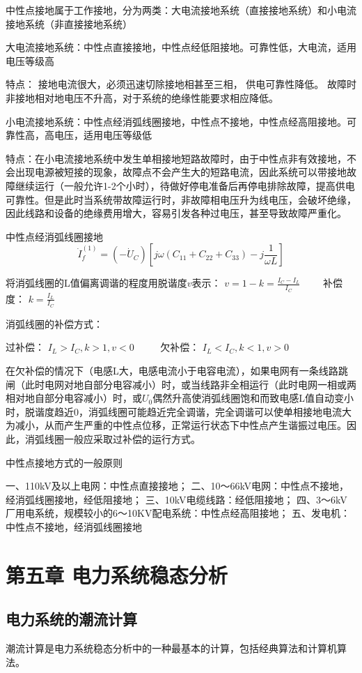 \documentclass[UTF8, 12pt, a4paper]{ctexart}
\begin{document}
中性点接地属于工作接地，分为两类：大电流接地系统（直接接地系统）和小电流接地系统（非直接接地系统）

大电流接地系统：中性点直接接地，中性点经低阻接地。可靠性低，大电流，适用电压等级高

特点： 接地电流很大，必须迅速切除接地相甚至三相， 供电可靠性降低。
故障时非接地相对地电压不升高，对于系统的绝缘性能要求相应降低。

小电流接地系统：中性点经消弧线圈接地，中性点不接地，中性点经高阻接地。可靠性高，高电压，适用电压等级低

特点：在小电流接地系统中发生单相接地短路故障时，由于中性点非有效接地，不会出现电源被短接的现象，故障点不会产生大的短路电流，因此系统可以带接地故障继续运行（一般允许1-2个小时），待做好停电准备后再停电排除故障，提高供电可靠性。但是此时当系统带故障运行时，非故障相电压升为线电压，会破坏绝缘，因此线路和设备的绝缘费用增大，容易引发各种过电压，甚至导致故障严重化。

中性点经消弧线圈接地
\[\dot { I } _ { f } ^ { ( 1 ) } = ( - \dot { U } _ { C } ) [ j \omega ( C _ { 11 } + C _ { 22 } + C _ { 33 } ) -j \frac { 1 } { \omega L }]\]

将消弧线圈的L值偏离调谐的程度用脱谐度$v$表示：
$v = 1 - k= \frac { I _ { C } - I _ { L } } { I _ { C } }$$\qquad$
补偿度：
$k = \frac { I _ { L } } { I _ { C } }$

消弧线圈的补偿方式：

过补偿：
$I _ { L } > I _ { C } , k > 1,v < 0 $
$\qquad$
欠补偿：
$I _ { L } < I _ { C } , k < 1,v > 0 $

在欠补偿的情况下（电感L大，电感电流小于电容电流），如果电网有一条线路跳闸（此时电网对地自部分电容减小）时，或当线路非全相运行（此时电网一相或两相对地自部分电容减小）时，或$U_0$偶然升高使消弧线圈饱和而致电感L值自动变小时，脱谐度趋近0，消弧线圈可能趋近完全调谐，完全调谐可以使单相接地电流大为减小，从而产生严重的中性点位移，正常运行状态下中性点产生谐振过电压。因此，消弧线圈一般应采取过补偿的运行方式。

中性点接地方式的一般原则

一、110kV及以上电网：中性点直接接地；
二、10～66kV电网：中性点不接地，经消弧线圈接地，经低阻接地；
三、10kV电缆线路：经低阻接地；
四、3～6kV厂用电系统，规模较小的6～10KV配电系统：中性点经高阻接地；
五、发电机：中性点不接地，经消弧线圈接地
\newpage{}
\section{第五章{} 电力系统稳态分析}
\subsection{电力系统的潮流计算}
潮流计算是电力系统稳态分析中的一种最基本的计算，包括经典算法和计算机算法。
\end{document}
